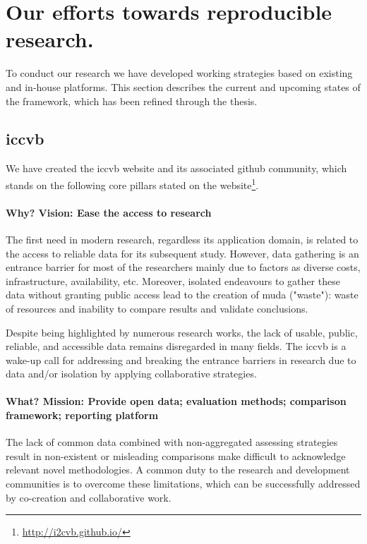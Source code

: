 \section{Our efforts towards reproducible research.}
To conduct our research we have developed working strategies based on existing and in-house platforms.
This section describes the current and upcoming states of the framework, which has been refined through the thesis.

\subsection{\acs{iccvb}}
We have created the \acs{iccvb} website and its associated github community, which stands on the following core pillars stated on the website\footnote{\url{http://i2cvb.github.io/}}.

\paragraph{Why? Vision: Ease the access to research}
The first need in modern research, regardless its application domain, is related to the access to reliable data for its subsequent study.
However, data gathering is an entrance barrier for most of the researchers mainly due to factors as diverse costs, infrastructure, availability, etc.
Moreover, isolated endeavours to gather these data without granting public access lead to the creation of muda ("waste"): waste of resources and inability to compare results and validate conclusions.

Despite being highlighted by numerous research works, the lack of usable, public, reliable, and accessible data remains disregarded in many fields.
The \ac{iccvb} is a wake-up call for addressing and breaking the entrance barriers in research due to data and/or isolation by applying collaborative strategies.

\paragraph{What? Mission: Provide open data; evaluation methods; comparison framework; reporting platform}
The lack of common data combined with non-aggregated assessing strategies result in non-existent or misleading comparisons make difficult to acknowledge relevant novel methodologies.
A common duty to the research and development communities is to overcome these limitations, which can be successfully addressed by co-creation and collaborative work.

